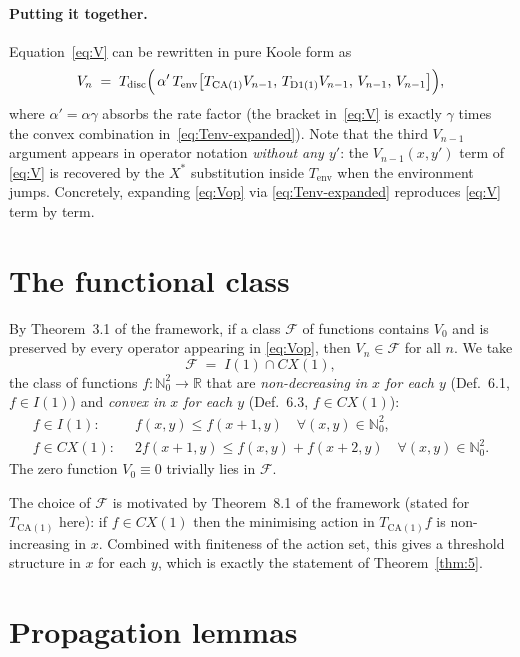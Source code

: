 \documentclass[11pt,a4paper]{article}
\newcommand{\R}{\mathbb{R}}
\newcommand{\N}{\mathbb{N}}
\newcommand{\F}{\mathcal{F}}
\newcommand{\Tdisc}{T_{\mathrm{disc}}}
\newcommand{\Tenv}{T_{\mathrm{env}}}
\newcommand{\Tca}{T_{\mathrm{CA}(1)}}
\newcommand{\Td}{T_{\mathrm{D1}(1)}}
\newcommand{\Cx}{CX}
\newcommand{\Iclass}{I}
\theoremstyle{definition}
\begin{document}
\paragraph{Putting it together.}
Equation~\eqref{eq:V} can be rewritten in pure Koole form as
\begin{equation}
\label{eq:Vop}
V_n \;=\; \Tdisc \Bigl(\, \alpha' \, \Tenv\bigl[\Tca V_{n-1},\, \Td V_{n-1},\, V_{n-1},\, V_{n-1}\bigr] \Bigr),
\end{equation}
where $\alpha' = \alpha \gamma$ absorbs the rate factor (the bracket
in~\eqref{eq:V} is exactly $\gamma$ times the convex combination
in~\eqref{eq:Tenv-expanded}). Note that the third $V_{n-1}$ argument
appears in operator notation \emph{without any $y'$}: the
$V_{n-1}(x, y')$ term of \eqref{eq:V} is recovered by the $X^*$
substitution inside $\Tenv$ when the environment jumps. Concretely,
expanding \eqref{eq:Vop} via \eqref{eq:Tenv-expanded} reproduces
\eqref{eq:V} term by term.

\section{The functional class}
\label{sec:class}

By Theorem~3.1 of the framework, if a class $\F$ of functions
contains $V_0$ and is preserved by every operator appearing in
\eqref{eq:Vop}, then $V_n \in \F$ for all $n$. We take
\[
    \F \;=\; \Iclass(1) \cap \Cx(1),
\]
the class of functions $f : \N_0^2 \to \R$ that are
\emph{non-decreasing in $x$ for each $y$}
(Def.~6.1, $f \in I(1)$) and \emph{convex in $x$ for each $y$}
(Def.~6.3, $f \in \Cx(1)$):
\begin{align*}
    f \in \Iclass(1) :\;&\;
        f(x, y) \le f(x + 1, y) \quad \forall (x, y) \in \N_0^2,\\
    f \in \Cx(1)     :\;&\;
        2 f(x + 1, y) \le f(x, y) + f(x + 2, y) \quad \forall (x, y) \in \N_0^2.
\end{align*}
The zero function $V_0 \equiv 0$ trivially lies in $\F$.

The choice of $\F$ is motivated by Theorem~8.1 of the framework
(stated for $\Tca$ here): if $f \in \Cx(1)$ then the minimising action
in $\Tca f$ is non-increasing in $x$. Combined with finiteness of the
action set, this gives a threshold structure in $x$ for each $y$,
which is exactly the statement of Theorem~\ref{thm:5}.

\section{Propagation lemmas}
\label{sec:prop}
\end{document}
